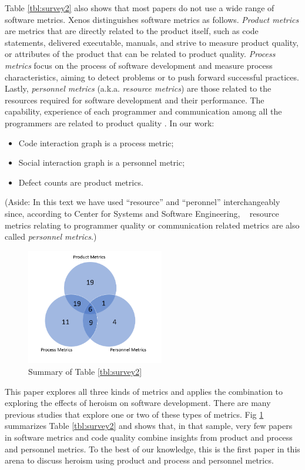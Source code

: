 \documentclass[smallextended]{svjour3}
\newcommand{\bi}{\begin{itemize}}
\newcommand{\ei}{\end{itemize}}
\begin{document}
Table \ref{tbl:survey2} also shows that most papers
do not use  a wide range of software metrics.
 Xenos \cite{Xenos} distinguishes software metrics as  follows.
 {\em Product metrics} are metrics that are directly related to the product itself, such as code statements, delivered executable, manuals, and strive to measure product quality, or attributes of the product that can be related to product quality.  
 {\em Process metrics} focus on the process of software development and measure process characteristics, aiming to
detect problems or to push forward successful practices.  
Lastly,  {\em personnel metrics} (a.k.a. {\em resource metrics})
are those related to the resources required for software development and their performance. The capability, experience of each programmer and communication among all the programmers are related to product quality \cite{wolf2009predicting,de2004sometimes,cataldo2013coordination,cataldo2007coordination}. 
 In our work:
 \bi
 \item   Code interaction graph  is a  process metric;
 \item Social interaction graph is a personnel  metric;
 \item Defect counts are product metrics.
\ei
(Aside: In this text we have used ``resource'' and ``peronnel'' interchangeably  since, according to Center for Systems and Software Engineering, ~\cite{Xenos} resource metrics relating to programmer quality or communication related metrics are also called {\em personnel metrics}.)



\begin{figure}[!t]
\begin{center}\includegraphics[width=6cm]{Venn.png}\end{center}
\caption{Summary of Table \ref{tbl:survey2}}
\label{fig:venn}
\end{figure}
 
This paper explores all  three kinds of metrics and applies the combination to exploring the effects of heroism on software development. There are many previous studies that explore one or two of these types of metrics.
Fig \ref{fig:venn} summarizes Table \ref{tbl:survey2} and shows that,
in that sample, very few papers in software metrics and code quality
combine insights from product and process and personnel metrics. 
To the best of our knowledge, this is the first paper in this arena to discuss heroism using   product and process and personnel metrics.   
\end{document}
